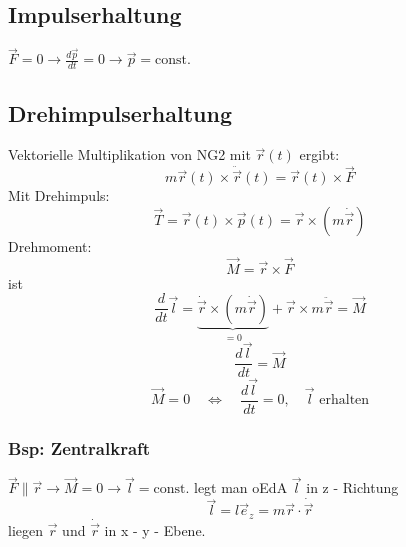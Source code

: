 \documentclass[titlepage,12pt,a4paper,ngerman]{report}
\newcommand{\tx}[1]{\textrm{#1}}
\newcommand{\const}{\tx{const.}}
\begin{document}
\subsection{Impulserhaltung}
$\vec{F} = 0 \rightarrow \frac{d\vec{p}}{dt} =0 \rightarrow \vec{p} = \const$

\subsection{Drehimpulserhaltung}
Vektorielle Multiplikation von NG2 mit $\vec{r} (t)$ ergibt:
$$m\vec{r}(t) \times \ddot{\vec{r}}(t) = \vec{r}(t) \times \vec{F}$$
Mit
Drehimpuls:
$$\vec{T} = \vec{r}(t) \times \vec{p}(t) = \vec{r} \times (m\dot{\vec{r}})$$ 
Drehmoment:
$$ \vec{M} = \vec{r} \times \vec{F}$$
ist
$$\frac{d}{dt}\vec{l} = \underbrace{\dot{\vec{r}} \times (m\dot{\vec{r}})}_{ =0} + \vec{r} \times m \ddot{\vec{r}} = \vec{M}$$
$$\frac{d\vec{l}}{dt} = \vec{M}$$
$$\vec{M} = 0 \quad \Leftrightarrow \quad \frac{d \vec{l}}{dt} = 0 , \quad \vec{l} \textrm{ erhalten}$$

\subsubsection{Bsp: Zentralkraft}
$\vec{F} \parallel  \vec{r} \rightarrow \vec{M} = 0 \rightarrow \vec{l}  = \const $
legt man oEdA $\vec{l}$ in z - Richtung \\
$$\vec{l} = l \vec{e}_z = m \vec{r}\cdot \dot{\vec{r}}$$
liegen $\vec{r}$ und $ \dot{\vec{r}}$ in x - y - Ebene.\par
\end{document}
